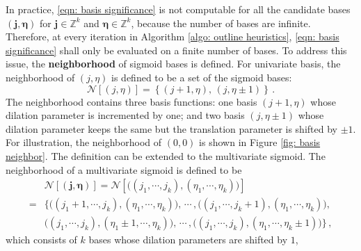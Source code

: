 In practice, \eqref{eqn: basis significance} is not computable
for all the candidate bases $(\boldsymbol{j}, \boldsymbol{\eta})$
for $\boldsymbol{j}\in \mathbb{Z}^k$ and
$\boldsymbol{\eta}\in \mathbb{Z}^k$, because the number of bases are infinite. 
Therefore, at every iteration in Algorithm \ref{algo: outline heuristics},
\eqref{eqn: basis significance} shall only be evaluated on a finite number of bases. 
To address this issue, the \textbf{neighborhood} of sigmoid bases is defined. 
For univariate basis, the neighborhood of $(j,\eta)$ is defined to be a set of the sigmoid bases:
\begin{equation}
    \mathcal{N}\left[ \left(j,\eta\right) \right]
    = \left\{ 
        \left( j+1, \eta\right),\,
        \left( j, \eta\pm 1 \right)
    \right\}\,.
    \label{eqn: neighborhood 1D}
\end{equation}
The neighborhood contains three basis functions: one basis 
$\left( j+1, \eta \right)$ 
whose dilation parameter is incremented by one; and
two basis $\left( j, \eta\pm 1 \right)$
whose dilation parameter keeps the same but the translation parameter is shifted by $\pm 1$.
For illustration, the neighborhood of $\left(0,0\right)$
is shown in Figure \ref{fig: basis neighbor}.
The definition can be extended to the multivariate sigmoid. 
The neighborhood of a multivariate sigmoid is defined to be
\begin{equation}\begin{split}
    &\mathcal{N}
    \left[
         \left(
               \boldsymbol{j}, \boldsymbol{\eta}
         \right)
    \right] = 
    \mathcal{N}\left[ \big((j_1, \cdots, j_k) , \left(
    \eta_1, \cdots, \eta_k \right) \big) \right]\\
    = & \bigg\{
            \big( \left( j_1+1,\cdots, j_k\right),
                   \left( \eta_1, \cdots, \eta_k \right)
            \big) ,\, \cdots \, ,
            \big( \left( j_1,\cdots, j_k+1\right),
                   \left( \eta_1, \cdots, \eta_k \right)
            \big),\,   \\
          & 
            \big( \left( j_1,\cdots, j_k\right),
                   \left( \eta_1\pm 1, \cdots, \eta_k \right)
            \big) ,\, \cdots \, ,
            \big( \left( j_1,\cdots, j_k\right),
                   \left( \eta_1, \cdots, \eta_k\pm 1 \right)
            \big) \bigg\}\,,
    \label{eqn: neighborhood kD}
\end{split}\end{equation}
which consists of $k$ bases whose dilation parameters are shifted by $1$, 
